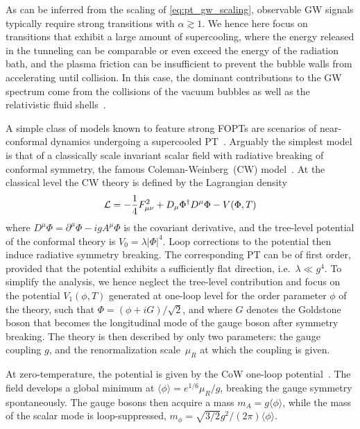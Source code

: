 \documentclass{article}
\begin{document}
As can be inferred from the scaling of \cref{eq:pt_gw_scaling}, observable GW signals typically require strong transitions with $\alpha \gtrsim 1$.
We hence here focus on transitions that exhibit a large amount of supercooling, where the energy released in the tunneling can be comparable or even exceed the energy of the radiation bath, and the plasma friction can be insufficient to prevent the bubble walls from accelerating until collision. 
In this case, the dominant contributions to the GW spectrum come from the collisions of the vacuum bubbles as well as the relativistic fluid shells~\cite{Lewicki:2022pdb}.

\bigskip 

A simple class of models known to feature strong FOPTs are scenarios of near-conformal dynamics undergoing a supercooled PT~\cite{Jinno:2016knw,Iso:2017uuu,Levi:2022bzt,Marzola:2017jzl,Azatov:2019png,Borah:2021ftr,Kierkla:2022odc,Freese:2022qrl}. Arguably the simplest model is that of a classically scale invariant scalar field with radiative breaking of conformal symmetry, the famous Coleman-Weinberg~(CW) model~\cite{Coleman:1973jx}.
At the classical level the CW theory is defined by the Lagrangian density
%
\begin{equation}
    {\cal L} = -\frac{1}{4}F^2_{\mu\nu}+D_{\mu}\Phi^\dagger D^{\mu}\Phi - V(\Phi,T)
\end{equation}
where $D^{\mu}\Phi=\partial^\mu\Phi-igA^\mu \Phi$ is the covariant derivative, and the tree-level potential of the conformal theory is $V_0 = \lambda |\Phi|^4$.
Loop corrections to the potential then induce radiative symmetry breaking.
The corresponding PT can be of first order, provided that the potential exhibits a sufficiently flat direction, i.e.\ $\lambda \ll g^4$.
To simplify the analysis, we hence neglect the tree-level contribution and focus on the potential $V_1(\phi,T)$ generated at one-loop level for the order parameter $\phi$ of the theory, such that $\Phi = (\phi + i G )/\sqrt{2}$, and where $G$ denotes the Goldstone boson that becomes the longitudinal mode of the gauge boson after symmetry breaking. 
The theory is then described by only two parameters: the gauge coupling $g$, and the renormalization scale~$\mu_R$ at which the coupling is given.

At zero-temperature, the potential is given by the CoW one-loop potential~\cite{Coleman:1973jx}. 
The field develops a global minimum at $\langle\phi\rangle= e^{1/6} \mu_R/g$, breaking the gauge symmetry spontaneously.
The gauge bosons then acquire a mass $m_A = g \langle\phi\rangle$, while the mass of the scalar mode is loop-suppressed, $m_\phi = \sqrt{3/2} g^2 / (2\pi) \langle\phi\rangle$.
\end{document}
